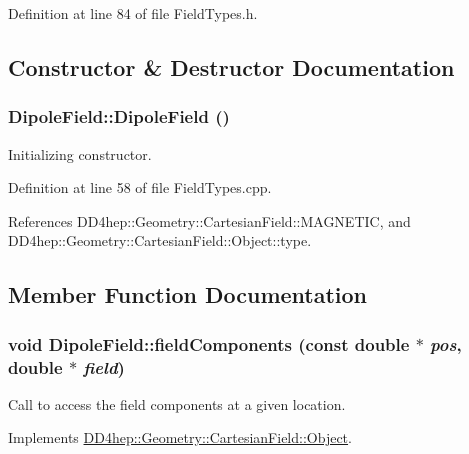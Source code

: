 Definition at line 84 of file FieldTypes.h.

\subsection{Constructor \& Destructor Documentation}
\hypertarget{class_d_d4hep_1_1_geometry_1_1_dipole_field_a7a431d40e83bd52565fccf2ed507780e}{
\subsubsection[{DipoleField}]{\setlength{\rightskip}{0pt plus 5cm}DipoleField::DipoleField ()}}
\label{class_d_d4hep_1_1_geometry_1_1_dipole_field_a7a431d40e83bd52565fccf2ed507780e}


Initializing constructor. 

Definition at line 58 of file FieldTypes.cpp.

References DD4hep::Geometry::CartesianField::MAGNETIC, and DD4hep::Geometry::CartesianField::Object::type.

\subsection{Member Function Documentation}
\hypertarget{class_d_d4hep_1_1_geometry_1_1_dipole_field_afee57d23345cdd6a457475d8fe6ac4a7}{
\subsubsection[{fieldComponents}]{\setlength{\rightskip}{0pt plus 5cm}void DipoleField::fieldComponents (const double $\ast$ {\em pos}, \/  double $\ast$ {\em field})}}
\label{class_d_d4hep_1_1_geometry_1_1_dipole_field_afee57d23345cdd6a457475d8fe6ac4a7}


Call to access the field components at a given location. 

Implements \hyperlink{class_d_d4hep_1_1_geometry_1_1_cartesian_field_1_1_object_ab3fa7f39545c8b0f769ee1ddfd03ed90}{DD4hep::Geometry::CartesianField::Object}.

